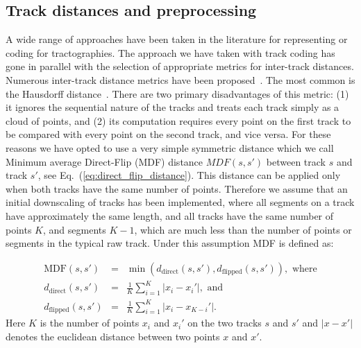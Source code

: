 \documentclass[journal]{IEEEtran}
\begin{document}
\subsection{\label{sub:track-distances}Track distances and preprocessing}

A wide range of approaches have been taken in the literature for
representing or coding for tractographies. The approach we have taken with track
coding has gone in parallel with the selection of appropriate metrics for
inter-track distances.  Numerous inter-track distance metrics have been
proposed~\cite{Ding2003, MaddahIPMI2007, zhang2005dti}. The most common is the
Hausdorff distance~\cite[and many other
studies]{corouge2004towards}. There are two primary disadvantages of
this metric: (1) it ignores the sequential nature of the tracks and
treats each track simply as a cloud of points, and (2) its computation
requires every point on the first track to be compared with every point
on the second track, and vice versa. For these reasons we have opted to
use a very simple symmetric distance \cite{EGMB10, Visser2010} which we
call Minimum average Direct-Flip (MDF) distance $MDF(s,s')$ between
track $s$ and track $s'$, see Eq.~(\ref{eq:direct_flip_distance}). This
distance can be applied only when both tracks have the same number of
points. Therefore we assume that an initial downscaling of tracks has
been implemented, where all segments on a track have approximately the
same length, and all tracks have the same number of points $K$, and segments
$K-1$, which are much less than the number of points or segments in the typical
raw track.  Under this assumption MDF is defined as:

\begin{eqnarray}
\textrm{MDF}(s,s') & = & \min(d_{\textrm{direct}}(s,s'),d_{\textrm{flipped}}(s,s')),\,\,\textrm{where}\label{eq:direct_flip_distance}\\
d_{\textrm{direct}}(s,s') & = & \frac{1}{K}\sum_{i=1}^{K}|x_{i}-x_{i}'|,\,\,\textrm{and}\nonumber\\
d_{\textrm{flipped}}(s,s') & = & \frac{1}{K}\sum_{i=1}^{K}|x_{i}-x_{K-i}'|.\nonumber
\end{eqnarray}
\noindent
Here $K$ is the number of points $x_{i}$ and $x_{i}'$ on the two tracks $s$ and $s'$
and $|x-x'|$ denotes the euclidean distance between two points $x$ and
$x'$.
\end{document}
